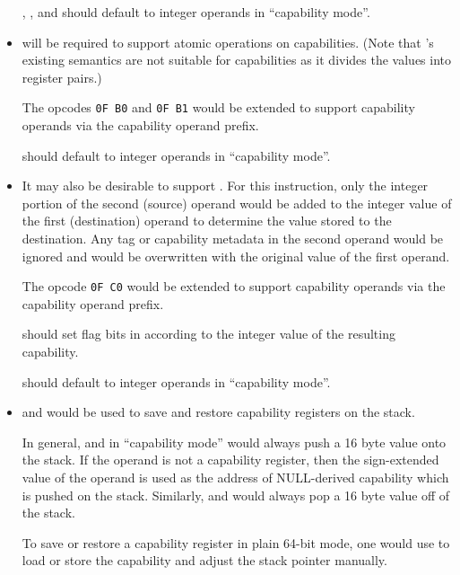\begin{itemize}
    , , and  should
    default to integer operands in ``capability mode''.

  \item {} will be required to support atomic
    operations on capabilities.  (Note that 's
    existing semantics are not suitable for capabilities as it divides
    the values into register pairs.)

    The opcodes \texttt{0F B0} and \texttt{0F B1} would be extended to
    support capability operands via the capability operand prefix.

     should default to integer operands in
    ``capability mode''.

  \item It may also be desirable to support .  For
    this instruction, only the integer portion of the second (source)
    operand would be added to the integer value of the first
    (destination) operand to determine the value stored to the
    destination.  Any tag or capability metadata in the second operand
    would be ignored and would be overwritten with the original value
    of the first operand.

    The opcode \texttt{0F C0} would be extended to support capability
    operands via the capability operand prefix.

     should set flag bits in \RFLAGS{} according to
    the integer value of the resulting capability.

     should default to integer operands in
    ``capability mode''.

  \item {} and  would be used to save
    and restore capability registers on the stack.

    In general,  and  in ``capability
    mode'' would always push a 16 byte value onto the stack.  If the
    operand is not a capability register, then the sign-extended value
    of the operand is used as the address of NULL-derived capability
    which is pushed on the stack.  Similarly,  and
     would always pop a 16 byte value off of the
    stack.

    To save or restore a capability register in plain 64-bit mode, one
    would use  to load or store the capability and
    adjust the stack pointer manually.


\end{itemize}
